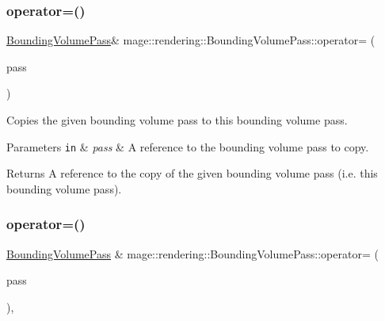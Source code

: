 \subsubsection{\texorpdfstring{operator=()}{operator=()}\hspace{0.1cm}{\footnotesize\ttfamily [1/2]}}
{\footnotesize\ttfamily \hyperlink{classmage_1_1rendering_1_1_bounding_volume_pass}{Bounding\+Volume\+Pass}\& mage\+::rendering\+::\+Bounding\+Volume\+Pass\+::operator= (\begin{DoxyParamCaption}\item[{const \hyperlink{classmage_1_1rendering_1_1_bounding_volume_pass}{Bounding\+Volume\+Pass} \&}]{pass }\end{DoxyParamCaption})\hspace{0.3cm}{\ttfamily [delete]}}

Copies the given bounding volume pass to this bounding volume pass.


\begin{DoxyParams}[1]{Parameters}
\mbox{\tt in}  & {\em pass} & A reference to the bounding volume pass to copy. \\
\hline
\end{DoxyParams}
\begin{DoxyReturn}{Returns}
A reference to the copy of the given bounding volume pass (i.\+e. this bounding volume pass). 
\end{DoxyReturn}
\hypertarget{classmage_1_1rendering_1_1_bounding_volume_pass_a39c5dffd1a1381672e3dbc14eb07c8cf}{}\label{classmage_1_1rendering_1_1_bounding_volume_pass_a39c5dffd1a1381672e3dbc14eb07c8cf} 
\subsubsection{\texorpdfstring{operator=()}{operator=()}\hspace{0.1cm}{\footnotesize\ttfamily [2/2]}}
{\footnotesize\ttfamily \hyperlink{classmage_1_1rendering_1_1_bounding_volume_pass}{Bounding\+Volume\+Pass} \& mage\+::rendering\+::\+Bounding\+Volume\+Pass\+::operator= (\begin{DoxyParamCaption}\item[{\hyperlink{classmage_1_1rendering_1_1_bounding_volume_pass}{Bounding\+Volume\+Pass} \&\&}]{pass }\end{DoxyParamCaption})\hspace{0.3cm}{\ttfamily [default]}, {\ttfamily [noexcept]}}

